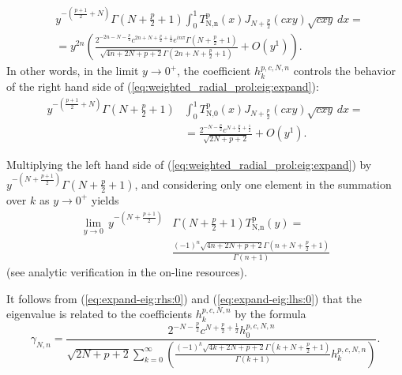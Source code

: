 \documentclass[12pt]{article}
\begin{document}
\begin{equation}\label{eq:expand-eig:rhs:0}
\begin{split}
&y^{-\left(\frac{p+1}{2}+N\right)} \Gamma \left(N+\frac{p}{2}+1\right) \int_0^1 T_{\text{N,n}}^{\text{p}}(x) J_{N+\frac{p}{2}}(c x y) \sqrt{c x y} \, dx = \\
&= y^{2 n}    \left(\frac{2^{-2 n-N-\frac{p}{2}} c^{2 n+N+\frac{p}{2}+\frac{1}{2}} e^{i n \pi } \Gamma\left(N+\frac{p}{2}+1\right)}{\sqrt{4 n+2 N+p+2} \Gamma \left(2 n+N+\frac{p}{2}+1\right)}+O\left(y^1\right)\right) . 
\end{split}
\end{equation}
In other words, in the limit $y \rightarrow 0^+$, the coefficient ${h}^{p,c,N,n}_k$ controls the behavior of the right hand side of (\ref{eq:weighted_radial_prol:eig:expand}):
\begin{equation}\label{eq:expand-eig:rhs:0:n0}
\begin{split}
 y^{-\left(\frac{p+1}{2}+N\right)} \Gamma \left(N+\frac{p}{2}+1\right) & \int_0^1  T_{\text{N,0}}^{\text{p}}(x) J_{N+\frac{p}{2}}(c x y) \sqrt{c x y} \, dx = \\
& = \frac{2^{-N-\frac{p}{2}}c^{N+\frac{p}{2}+\frac{1}{2}}}{\sqrt{2 N+p+2}}+O\left(y^1\right) .
\end{split}
\end{equation}

Multiplying the left hand side of (\ref{eq:weighted_radial_prol:eig:expand}) by $y^{-\left(N+\frac{p+1}{2}\right)} \Gamma \left(N+\frac{p}{2}+1\right)$, and considering only one element in the summation over $k$ as $y \rightarrow 0^+$ yields
\begin{equation}\label{eq:expand-eig:lhs:0}
\begin{split}
\lim_{y\to 0} \, y^{-\left(N+\frac{p+1}{2}\right)} & \Gamma \left(N+\frac{p}{2}+1\right) T_{\text{N,n}}^{\text{p}}(y) = \\
& \frac{(-1)^n \sqrt{4 n+2 N+p+2} \Gamma \left(n+N+\frac{p}{2}+1\right)}{\Gamma (n+1)}
\end{split}
\end{equation}
(see analytic verification in the on-line resources). 

It follows from (\ref{eq:expand-eig:rhs:0}) and (\ref{eq:expand-eig:lhs:0}) that the eigenvalue is related to the coefficients ${h}^{p,c,N,n}_k$ by the formula
\begin{equation}\label{eq:expand-eig:gam}
  \gamma_{N,n} = \frac{2^{-N-\frac{p}{2}}c^{N+\frac{p}{2}+\frac{1}{2}} {h}^{p,c,N,n}_0 }{ \sqrt{2 N+p+2}  \sum_{k=0}^{\infty} \left( \frac{(-1)^k \sqrt{4 k+2 N+p+2} \Gamma \left(k+N+\frac{p}{2}+1\right)}{\Gamma (k+1)} {h}^{p,c,N,n}_k \right) }.
\end{equation}
\end{document}
